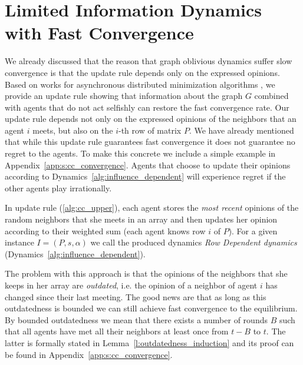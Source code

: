 \section{Limited Information Dynamics with Fast Convergence}\label{s:cc_convergence}

We already discussed that the reason that graph oblivious dynamics suffer slow
convergence is that the update rule depends only on the expressed opinions.
Based on works for asynchronous distributed minimization algorithms
\cite{BT97,CC16}, we provide an update rule showing that information about the
graph $G$ combined with agents that do not act selfishly can restore the
fast convergence rate.
Our update rule depends not only on the expressed opinions of the
neighbors that an agent $i$ meets, but also on the $i$-th row of matrix $P$.
We have already mentioned that while this update rule guarantees fast convergence
it does not guarantee no regret to the agents.  To make this concrete we include
a simple example in Appendix~\ref{app:s:cc_convergence}.  Agents that choose
to update their opinions according to Dynamics~\ref{alg:influence_dependent}
will experience regret if the other agents play irrationally.

In update rule (\ref{alg:cc_upper}), each agent stores the
\emph{most recent} opinions of the random neighbors that she meets in an array
and then updates her opinion according to their weighted sum
(each agent knows row $i$ of $P$). For a given instance
$I=(P,s,\alpha)$ we call the produced dynamics \emph{Row Dependent dynamics}
(Dynamics~\ref{alg:influence_dependent}).

The problem with this approach is that the opinions of the neighbors
that she keeps in her array are \emph{outdated}, i.e. the opinion of
a neighbor of agent $i$ has changed since their last meeting.
The good news are that as long as this outdatedness
is bounded we can still achieve fast convergence to the
equilibrium.  By bounded outdatedness we mean that there exists a
number of rounds $B$ such that all agents have met all their neighbors
at least once from $t-B$ to $t$.  The latter is formally stated in
Lemma~\ref{l:outdatedness_induction} and its proof can be found in
Appendix~\ref{app:s:cc_convergence}.

